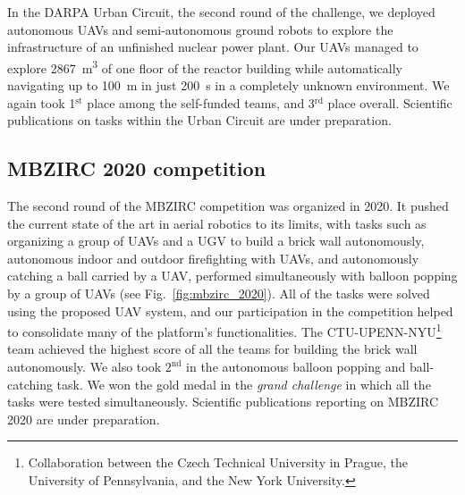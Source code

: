 \documentclass[a4paper,11pt,titlepage,twoside]{book}
\newcommand{\reffig}[1]{Fig.~\ref{#1}}
\begin{document}
  In the \ac{DARPA} Urban Circuit, the second round of the challenge, we deployed autonomous \acp{UAV} and semi-autonomous ground robots to explore the infrastructure of an unfinished nuclear power plant.
  Our \acp{UAV} managed to explore \SI{2867}{\meter\cubed} of one floor of the reactor building while automatically navigating up to \SI{100}{\meter} in just \SI{200}{\second} in a completely unknown environment.
  We again took 1$^{\text{st}}$ place among the self-funded teams, and 3$^{\text{rd}}$ place overall.
  Scientific publications on tasks within the Urban Circuit are under preparation.

  \subsection{MBZIRC 2020 competition}

  The second round of the \ac{MBZIRC} competition was organized in 2020.
  It pushed the current state of the art in aerial robotics to its limits, with tasks such as organizing a group of \acp{UAV} and a \ac{UGV} to build a brick wall autonomously, autonomous indoor and outdoor firefighting with \acp{UAV}, and autonomously catching a ball carried by a \ac{UAV}, performed simultaneously with balloon popping by a group of \acp{UAV} (see \reffig{fig:mbzirc_2020}).
  All of the tasks were solved using the proposed \ac{UAV} system, and our participation in the competition helped to consolidate many of the platform's functionalities.
  The CTU-UPENN-NYU\footnote{Collaboration between the Czech Technical University in Prague, the University of Pennsylvania, and the New York University.} team achieved the highest score of all the teams for building the brick wall autonomously.
  We also took $2^{\text{nd}}$ in the autonomous balloon popping and ball-catching task.
  We won the gold medal in the \emph{grand challenge} in which all the tasks were tested simultaneously.
  Scientific publications reporting on \ac{MBZIRC} 2020 are under preparation.
\end{document}
